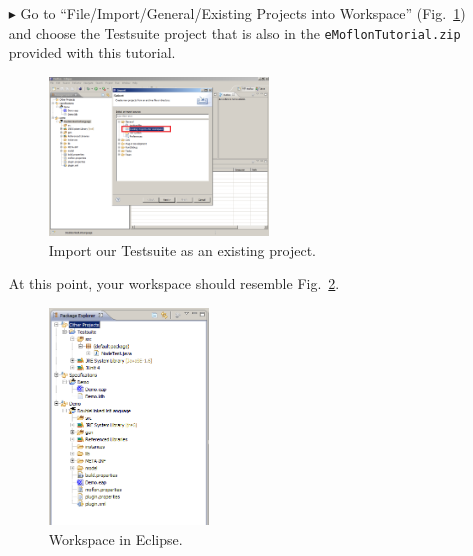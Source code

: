 \begin{enumerate}
\item[$\blacktriangleright$] Go to ``File/Import/General/Existing Projects
into Workspace'' (Fig.~\ref{fig_eclipseTestsuiteImport}) and choose the
Testsuite project that is also in the \texttt{eMoflonTutorial.zip} provided
with this tutorial. 
\begin{figure}[htbp]
	\centering
  \includegraphics[width=0.55\textwidth]{pics/installationAndSetup/eclipse_testsuitimport.png}
	\caption{Import our Testsuite as an existing project.}
	\label{fig_eclipseTestsuiteImport}
\end{figure} 

\item[] At this point, your workspace should resemble
Fig.~\ref{fig_eclipsepackageexplorer}.
\begin{figure}[htbp]
	\centering
  \includegraphics[width=0.4\textwidth]{pics/installationAndSetup/eclipse_packageexplorer.png}
	\caption{Workspace in Eclipse.}
	\label{fig_eclipsepackageexplorer}
\end{figure}


\end{enumerate}

